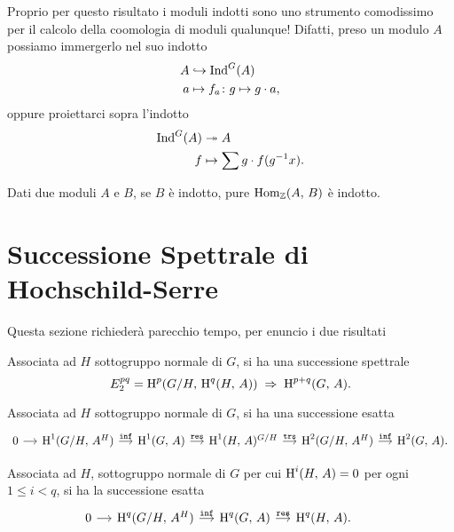 Proprio per questo risultato i moduli indotti sono uno strumento comodissimo per il calcolo della coomologia di moduli qualunque! Difatti, preso un modulo $ A $ possiamo immergerlo nel suo indotto
\begin{align*}
A &\hookrightarrow \operatorname{Ind}^G(A) \\
a & \mapsto f_a \colon g \mapsto g \cdot a, \end{align*} 
oppure proiettarci sopra l'indotto
\begin{align*}
\operatorname{Ind}^G(A) &\twoheadrightarrow A  \\
f & \mapsto \sum g \cdot f(g^{-1}x).
\end{align*}

\begin{lemma}\label{scappa}
	Dati due moduli $ A $ e $ B $, se $ B $ è indotto, pure $ \operatorname{Hom}_{\mathbb{Z}}(A, \, B) $ è indotto.
\end{lemma}

\section{Successione Spettrale di Hochschild-Serre}

Questa sezione richiederà parecchio tempo, per enuncio i due risultati

\begin{theorem}
	Associata ad $ H $ sottogruppo normale di $ G $, si ha una successione spettrale
	\[ E^{pq}_2 = \operatorname{H}^p(G/H, \, \operatorname{H}^q(H, \, A)) \;\Rightarrow\; \operatorname{H}^{p+q}(G, \, A). \]
\end{theorem}

\begin{corollary}\label{boo1}
	Associata ad $ H $ sottogruppo normale di $ G $, si ha una successione esatta
	\[\begin{tikzcd}[column sep = small]
	0 \rar & \HH^1(G/H, \, A^H) \rar["\Inf"]
	& \HH^1(G, \, A) \rar["\Res"]
	& \HH^1(H, \, A)^{G/H} \rar["\texttt{trs}"]
	& \HH^2(G/H, \, A^H) \rar["\Inf"]
	& \HH^2(G, \, A).
	\end{tikzcd} \]
\end{corollary}

\begin{corollary}\label{boo2}
	Associata ad $ H $, sottogruppo normale di $ G $ per cui $ \operatorname{H}^i(H, \, A ) = 0 $ per ogni $ 1 \leq i < q $, si ha la successione esatta
	\[\begin{tikzcd}[column sep = small]
	0 \rar & \HH^q(G/H, \, A^H) \rar["\Inf"]
	& \HH^q(G, \, A) \rar["\Res"]
	& \HH^q(H, \, A).
	\end{tikzcd} \qquad  \]
\end{corollary}

